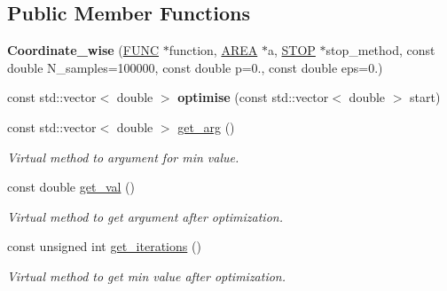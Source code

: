 \subsection*{Public Member Functions}
\begin{DoxyCompactItemize}
\item 
\mbox{\label{class_coordinate__wise_ad14fedb5fb6ad12c8ebb24dd2b91b235}} 
{\bfseries Coordinate\+\_\+wise} (\hyperlink{class_f_u_n_c}{F\+U\+NC} $\ast$function, \hyperlink{class_a_r_e_a}{A\+R\+EA} $\ast$a, \hyperlink{class_s_t_o_p}{S\+T\+OP} $\ast$stop\+\_\+method, const double N\+\_\+samples=100000, const double p=0., const double eps=0.)
\item 
\mbox{\label{class_coordinate__wise_a7558f5365ca2a1a29385a204389585db}} 
const std\+::vector$<$ double $>$ {\bfseries optimise} (const std\+::vector$<$ double $>$ start)
\item 
\mbox{\label{class_coordinate__wise_a01b078176d338e1fd922eb3584900514}} 
const std\+::vector$<$ double $>$ \hyperlink{class_coordinate__wise_a01b078176d338e1fd922eb3584900514}{get\+\_\+arg} ()
\begin{DoxyCompactList}\small\item\em Virtual method to argument for min value. \end{DoxyCompactList}\item 
\mbox{\label{class_coordinate__wise_a2baa2713d306326b7c322782cdb0dd65}} 
const double \hyperlink{class_coordinate__wise_a2baa2713d306326b7c322782cdb0dd65}{get\+\_\+val} ()
\begin{DoxyCompactList}\small\item\em Virtual method to get argument after optimization. \end{DoxyCompactList}\item 
\mbox{\label{class_coordinate__wise_ad777100de4f76340bd2b7a03628d0d48}} 
const unsigned int \hyperlink{class_coordinate__wise_ad777100de4f76340bd2b7a03628d0d48}{get\+\_\+iterations} ()
\begin{DoxyCompactList}\small\item\em Virtual method to get min value after optimization. \end{DoxyCompactList}\end{DoxyCompactItemize}
